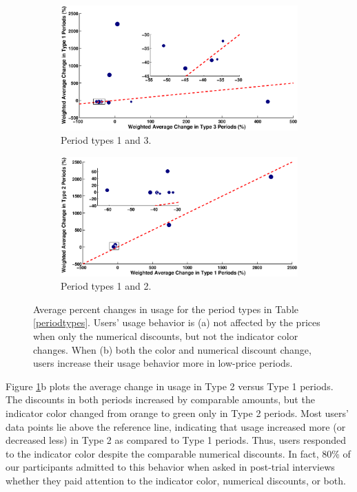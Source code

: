 \begin{figure}
\centering
	\begin{subfigure}[b]{0.51\textwidth}
		\includegraphics[width = \textwidth]{Figures/OHP_OLP_OHP.eps}
		\caption{Period types 1 and 3.}
	\end{subfigure}
	\hspace{-0.05\textwidth}
	\begin{subfigure}[b]{0.51\textwidth}
		\includegraphics[width = \textwidth]{Figures/OHP_GLP_OLP.eps}
		\caption{Period types 1 and 2.}
	\end{subfigure}
\vspace{-0.1in}
\caption{Average percent changes in usage for the period types in Table \ref{periodtypes}. Users' usage behavior is (a) not affected by the prices when only the numerical discounts, but not the indicator color changes. When (b) both the color and numerical discount change, users increase their usage behavior more in low-price periods.}
\label{fig:OHP_OLP_OHP}
\vspace{-0.1in}
\end{figure}
Figure \ref{fig:OHP_OLP_OHP}b plots the average change in usage in Type 2 versus Type 1 periods.  The discounts in both periods increased by comparable amounts, but the indicator color changed from orange to green only in Type 2 periods.  Most users' data points lie above the reference line, indicating that usage increased more (or decreased less) in Type 2 as compared to Type 1 periods. Thus, users responded to the indicator color despite the comparable numerical discounts. In fact, 80\% of our participants admitted to this behavior when asked in post-trial interviews whether they paid attention to the indicator color, numerical discounts, or both.

